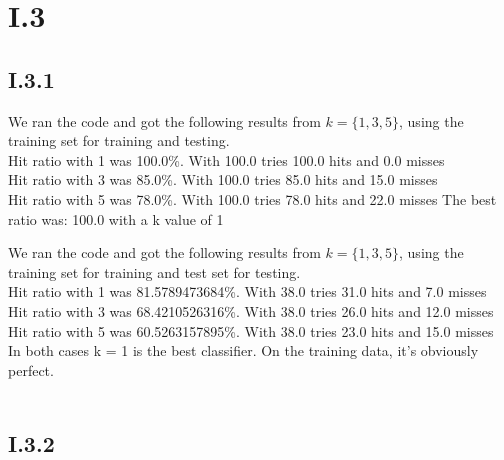 \documentclass{article}
\begin{document}
\section{I.3}


\subsection{I.3.1}

We ran the code and got the following results from $k = \{1,3,5\}$, using the training set for training and testing.\\ 

Hit ratio with 1 was 100.0\%. With 100.0 tries 100.0 hits and 0.0 misses\\
Hit ratio with 3 was 85.0\%. With 100.0 tries 85.0 hits and 15.0 misses\\
Hit ratio with 5 was 78.0\%. With 100.0 tries 78.0 hits and 22.0 misses
The best ratio was: 100.0 with a k value of 1


We ran the code and got the following results from $k = \{1,3,5\}$, using the training set for training and test set for testing.\\ 

Hit ratio with 1 was 81.5789473684\%. With 38.0 tries 31.0 hits and 7.0 misses\\
Hit ratio with 3 was 68.4210526316\%. With 38.0 tries 26.0 hits and 12.0 misses\\
Hit ratio with 5 was 60.5263157895\%. With 38.0 tries 23.0 hits and 15.0 misses\\
In both cases k = 1 is the best classifier. On the training data, it's
obviously perfect. \\\\

\subsection{I.3.2}
\end{document}
